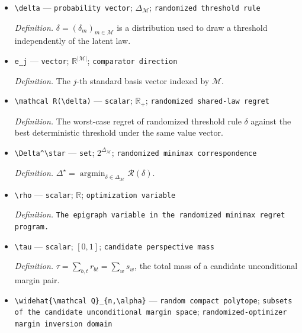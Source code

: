 \documentclass{article}
\begin{document}
\begin{itemize}
  \par\smallskip\noindent\emph{Definition.} \(\Delta_{\mathcal M}=\{\delta\in\mathbb R_+^{|\mathcal M|}:\sum_{m\in\mathcal M}\delta_m=1\}\).
  \item \texttt{\textbackslash{}\allowbreak{}delta} --- \texttt{probability vector}; \(\Delta_{\mathcal M}\); \texttt{randomized threshold rule}
  \par\smallskip\noindent\emph{Definition.} \(\delta=(\delta_m)_{m\in\mathcal M}\) is a distribution used to draw a threshold independently of the latent law.
  \item \texttt{e\_\allowbreak{}j} --- \texttt{vector}; \(\mathbb R^{|\mathcal M|}\); \texttt{comparator direction}
  \par\smallskip\noindent\emph{Definition.} The \(j\)-th standard basis vector indexed by \(\mathcal M\).
  \item \texttt{\textbackslash{}\allowbreak{}mathcal R(\textbackslash{}\allowbreak{}delta)} --- \texttt{scalar}; \(\mathbb R_+\); \texttt{randomized shared-\allowbreak{}law regret}
  \par\smallskip\noindent\emph{Definition.} The worst-case regret of randomized threshold rule \(\delta\) against the best deterministic threshold under the same value vector.
  \item \texttt{\textbackslash{}\allowbreak{}Delta\textasciicircum{}\textbackslash{}\allowbreak{}star} --- \texttt{set}; \(2^{\Delta_{\mathcal M}}\); \texttt{randomized minimax correspondence}
  \par\smallskip\noindent\emph{Definition.} \(\Delta^\star=\operatorname*{argmin}_{\delta\in\Delta_{\mathcal M}}\mathcal R(\delta)\).
  \item \texttt{\textbackslash{}\allowbreak{}rho} --- \texttt{scalar}; \(\mathbb R\); \texttt{optimization variable}
  \par\smallskip\noindent\emph{Definition.} \texttt{The epigraph variable in the randomized minimax regret program.}
  \item \texttt{\textbackslash{}\allowbreak{}tau} --- \texttt{scalar}; \([0,1]\); \texttt{candidate perspective mass}
  \par\smallskip\noindent\emph{Definition.} \(\tau=\sum_{b,t}r_{bt}=\sum_ws_w\), the total mass of a candidate unconditional margin pair.
  \item \texttt{\textbackslash{}\allowbreak{}widehat\{\textbackslash{}\allowbreak{}mathcal Q\}\allowbreak{}\_\allowbreak{}\{n,\allowbreak{}\textbackslash{}\allowbreak{}alpha\}\allowbreak{}} --- \texttt{random compact polytope}; \texttt{subsets of the candidate unconditional margin space}; \texttt{randomized-\allowbreak{}optimizer margin inversion domain}

\end{itemize}
\end{document}
